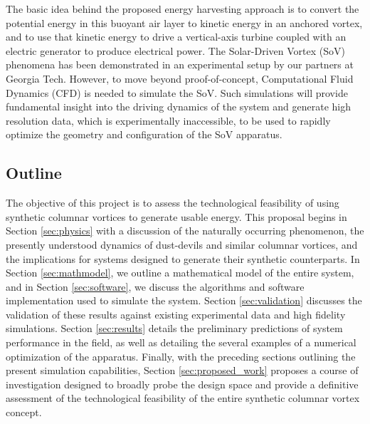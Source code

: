 The basic idea behind the proposed energy harvesting approach is to convert the 
potential energy in this buoyant air layer to kinetic energy in an
anchored vortex, and to use that kinetic energy to drive a
vertical-axis turbine coupled with an electric generator  to
produce electrical power. 
The Solar-Driven Vortex (SoV) phenomena has been demonstrated in
an experimental setup by our partners at Georgia Tech. However, to 
move beyond proof-of-concept, Computational Fluid 
Dynamics (CFD) is needed to simulate the SoV. Such simulations will
provide fundamental insight into the 
driving dynamics of the system and generate high resolution data, which is
experimentally inaccessible, to be used to rapidly optimize the
geometry and configuration of the SoV apparatus. 


%
%

\subsection{Outline}

The objective of this project is to assess the technological feasibility of 
using synthetic columnar vortices to generate usable energy. 
This proposal begins in Section \ref{sec:physics} with a discussion of the 
naturally occurring phenomenon, the presently understood dynamics of
dust-devils and similar columnar vortices, and the implications for systems
designed to generate their synthetic counterparts. 
In Section \ref{sec:mathmodel}, we outline a mathematical model of
the entire system, and in Section \ref{sec:software}, we discuss the
algorithms and software implementation used to simulate the
system. Section \ref{sec:validation} discusses the 
validation of these results against existing experimental data and high
fidelity simulations. Section \ref{sec:results} details the preliminary
predictions of system performance in the field, as well as detailing the 
several examples of a numerical optimization of the apparatus. Finally, with the 
preceding sections outlining the present simulation capabilities, 
Section \ref{sec:proposed_work} proposes a course of investigation
designed to broadly probe the design space and provide a
definitive assessment of the technological feasibility of the entire 
synthetic columnar vortex concept. 


